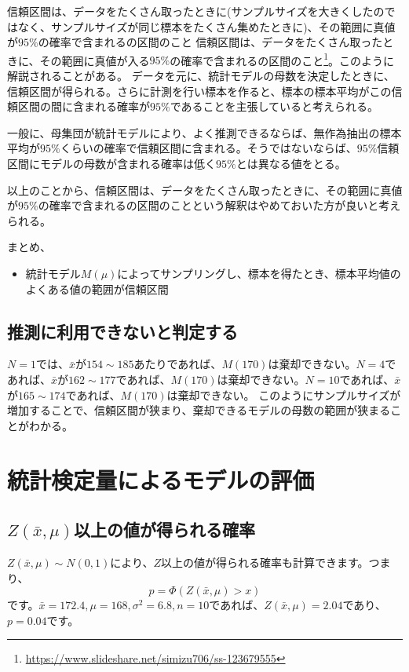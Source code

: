 \begin{SMbox}{信頼区間は、データをたくさん取ったときに(サンプルサイズを大きくしたのではなく、サンプルサイズが同じ標本をたくさん集めたときに)、その範囲に真値が$95\%$の確率で含まれるの区間のこと}
信頼区間は、データをたくさん取ったときに、その範囲に真値が入る$95\%$の確率で含まれるの区間のこと\footnote{\url{https://www.slideshare.net/simizu706/ss-123679555}}。このように解説されることがある。
データを元に、統計モデルの母数を決定したときに、信頼区間が得られる。さらに計測を行い標本を作ると、標本の標本平均がこの信頼区間の間に含まれる確率が$95\%$であることを主張していると考えられる。

一般に、母集団が統計モデルにより、よく推測できるならば、無作為抽出の標本平均が$95\%$くらいの確率で信頼区間に含まれる。そうではないならば、$95\%$信頼区間にモデルの母数が含まれる確率は低く$95\%$とは異なる値をとる。

以上のことから、信頼区間は、データをたくさん取ったときに、その範囲に真値が$95\%$の確率で含まれるの区間のことという解釈はやめておいた方が良いと考えられる。
\end{SMbox}


\begin{framed}
まとめ、
\begin{itemize}
    \item 統計モデル$M(\mu)$によってサンプリングし、標本を得たとき、標本平均値のよくある値の範囲が信頼区間
\end{itemize}
\end{framed}


\subsection{推測に利用できないと判定する}

$N=1$では、$\bar{x}$が$154\sim185$あたりであれば、$M(170)$は棄却できない。$N=4$であれば、$\bar{x}$が$162\sim177$であれば、$M(170)$は棄却できない。$N=10$であれば、$\bar{x}$が$165\sim174$であれば、$M(170)$は棄却できない。
このようにサンプルサイズが増加することで、信頼区間が狭まり、棄却できるモデルの母数の範囲が狭まることがわかる。
\fi

\section{統計検定量によるモデルの評価}


\subsection{$Z(\bar{x},\mu)$以上の値が得られる確率}
$Z(\bar{x},\mu)\sim N(0,1)$により、$Z$以上の値が得られる確率も計算できます。つまり、
\begin{equation*}
    p = \varPhi(Z(\bar{x},\mu)>x)
\end{equation*}
です。$\bar{x}=172.4,\mu=168,\sigma^2=6.8,n=10$であれば、$Z(\bar{x},\mu)=2.04$であり、
$p=0.04$です。

